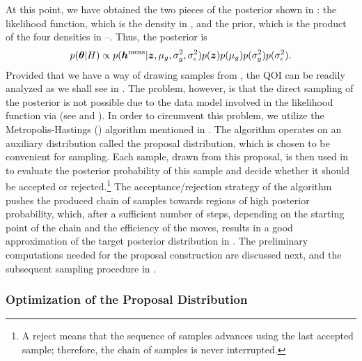 At this point, we have obtained the two pieces of the posterior shown in
: the likelihood function, which is the density in
, and the prior, which is the product of the four densities in
--. Thus, the posterior is
\begin{equation} \elab{posterior}
  p(\vt | H) \propto p(\vh^\measured | \vz, \mu_\g, \sigma^2_\g, \sigma^2_\epsilon) p(\vz) p(\mu_\g) p(\sigma^2_\g) p(\sigma^2_\epsilon).
\end{equation}
Provided that we have a way of drawing samples from , the
\ac{QOI} can be readily analyzed as we shall see in . The
problem, however, is that the direct sampling of the posterior is not possible
due to the data model involved in the likelihood function via \vh (see
 and ). In order to circumvent this problem,
we utilize the Metropolis-Hastings () algorithm \cite{gelman2004}
mentioned in . The algorithm operates on an auxiliary
distribution called the proposal distribution, which is chosen to be convenient
for sampling. Each sample, drawn from this proposal, is then used in
 to evaluate the posterior probability of this sample and decide
whether it should be accepted or rejected.\footnote{A reject means that the
sequence of samples advances using the last accepted sample; therefore, the
chain of samples is never interrupted.} The acceptance/rejection strategy of the
 algorithm pushes the produced chain of samples towards regions of high
posterior probability, which, after a sufficient number of steps, depending on
the starting point of the chain and the efficiency of the moves, results in a
good approximation of the target posterior distribution in . The
preliminary computations needed for the proposal construction are discussed
next, and the subsequent sampling procedure in .

\subsubsection{Optimization of the Proposal Distribution}

